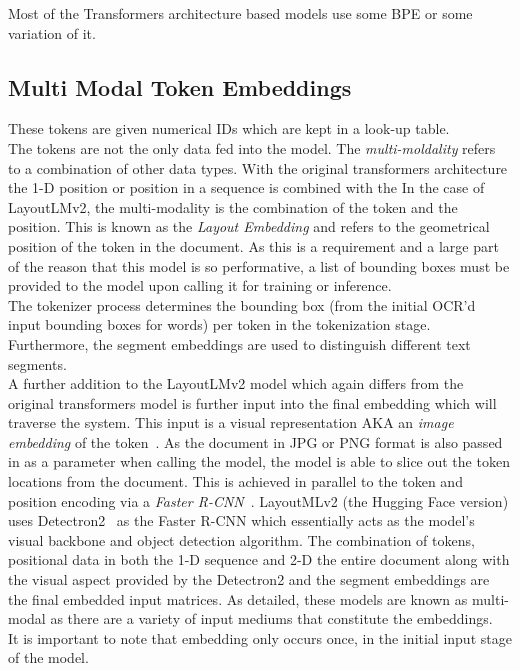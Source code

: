 Most of the Transformers architecture based models use some BPE or some variation of it.
\subsection{Multi Modal Token Embeddings}
These tokens are given numerical IDs which are kept in a look-up table.\\
The tokens are not the only data fed into the model. The \emph{multi-moldality} refers to a combination of other data types. With the original
transformers architecture the 1-D position or position in a sequence is combined with the  In the case of
LayoutLMv2, the multi-modality is the combination of the token and the position. This is known as the \emph{Layout Embedding} and refers to the geometrical position of the token in the document.
As this is a requirement and a large part of the reason that this model is so performative, a list of bounding boxes must be provided to the model
upon calling it for training or inference. \\
The tokenizer process determines the bounding box (from the initial OCR'd input bounding boxes for words) per token in the tokenization stage.
\bigbreak
Furthermore, the segment embeddings are used to distinguish different text segments.\\
A further addition to the LayoutLMv2 model which again differs from the original transformers model is further input into the final embedding which
will traverse the system. This input is a visual representation AKA an \emph{image embedding} of the token~\autocite{LayoutLMExplained2022}.
As the document in JPG or PNG format is also passed in as a parameter when calling the model, the model is able to slice out the token locations
from the document. This is achieved in parallel to the token and position encoding via a \emph{Faster R-CNN}~\autocite{FasterRCNNExplained2020}.
LayoutMLv2 (the Hugging Face version) uses Detectron2~\autocite{FacebookresearchDetectron22022} as the Faster R-CNN which essentially acts as the model's visual backbone and
object detection algorithm.
\bigbreak
The combination of tokens, positional data in both the 1-D sequence and 2-D the entire document along with the visual aspect provided by the
Detectron2 and the segment embeddings are the final embedded input matrices. As detailed, these models are known as multi-modal as there are a variety of input mediums that constitute the
embeddings.\\
It is important to note that embedding only occurs once, in the initial input stage of the model.
